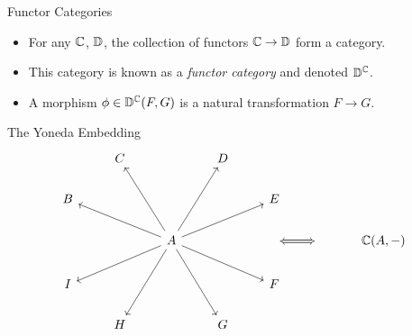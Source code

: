\begin{frame}{Functor Categories}
	\begin{itemize}
		\item For any $\mathbb{C}$, $\mathbb{D}$, the collection of functors $\mathbb{C} \to \mathbb{D}$ form a category.
		\pause\item This category is known as a \textit{functor category} and denoted $\mathbb{D}^{\mathbb{C}}$.
		\pause\item A morphism $\phi \in \mathbb{D}^{\mathbb{C}}(F, G)$ is a natural transformation $F \to G$.
	\end{itemize}
\end{frame}
\begin{frame}[fragile]{The Yoneda Embedding}
	\[\begin{tikzcd}
		& C && D \\
		B &&&& E \\
		&& A && {} & {} & {\mathbb{C}(A, -)} \\
		I &&&& F \\
		& H && G
		\arrow[from=3-3, to=1-2]
		\arrow[from=3-3, to=1-4]
		\arrow[from=3-3, to=2-1]
		\arrow[from=3-3, to=2-5]
		\arrow[from=3-3, to=4-1]
		\arrow[from=3-3, to=4-5]
		\arrow[from=3-3, to=5-2]
		\arrow[from=3-3, to=5-4]
		\arrow[Leftrightarrow, from=3-5, to=3-6]
	\end{tikzcd}\]
\end{frame}

